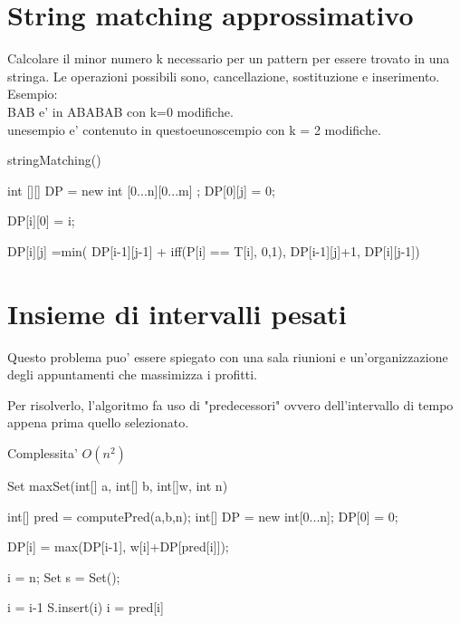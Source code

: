 \documentclass[oneside]{book}
\begin{document}
\newpage

\section{String matching approssimativo}
Calcolare il minor numero k necessario per un pattern per essere trovato in una stringa. Le operazioni possibili sono, cancellazione, sostituzione e inserimento. Esempio:\\
BAB e' in ABABAB con k=0 modifiche. \\
unesempio e' contenuto in questoeunoscempio con k = 2 modifiche.


\begin{algorithm}
\caption{stringMatching()}\label{alg:cap}
\begin{algorithmic}
\State int [][] DP = new int [0...n][0...m] ;
 DP[0][j] = 0;
\EndFor

 DP[i][0] = i;
\EndFor

		\State DP[i][j] =min( \State DP[i-1][j-1] + iff(P[i] == T[i], 0,1),
	\State        DP[i-1][j]+1,
	\State        DP[i][j-1])
	\EndFor

\EndFor
\end{algorithmic}
\end{algorithm}
\newpage
\section{Insieme di intervalli pesati}
Questo problema puo' essere spiegato con una sala riunioni e un'organizzazione degli appuntamenti che massimizza i profitti.

Per risolverlo, l'algoritmo fa uso di "predecessori" ovvero dell'intervallo di tempo appena prima quello selezionato.

Complessita' $O(n^2)$

\begin{algorithm}
\caption{Set maxSet(int[] a, int[] b, int[]w, int n)\label{alg:cap}}
\begin{algorithmic}

\State int[] pred = computePred(a,b,n);
\State int[] DP = new int[0...n];
\State DP[0] = 0;
	\item DP[i] = max(DP[i-1], w[i]+DP[pred[i]]);
\EndFor

\State i = n;
\State Set s = Set();


		\State i = i-1
	\Else
		S.insert(i)
		i = pred[i]
	\EndIf
\EndWhile

\end{algorithmic}
\end{algorithm}
\end{document}
